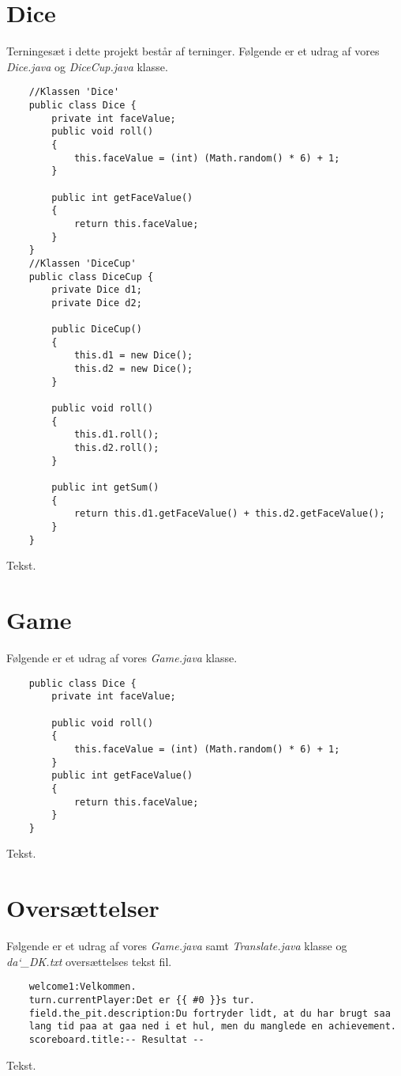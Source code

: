 \section{Dice}
\noindent Terningesæt i dette projekt består af terninger. Følgende er et udrag af vores \textit{Dice.java} og \textit{DiceCup.java} klasse.\\
\begin{lstlisting}
    //Klassen 'Dice'    
    public class Dice {
        private int faceValue;
        public void roll()
        {
            this.faceValue = (int) (Math.random() * 6) + 1;
        }
    
        public int getFaceValue()
        {
            return this.faceValue;
        }
    }
    //Klassen 'DiceCup'
    public class DiceCup {
        private Dice d1;
        private Dice d2;

        public DiceCup()
        {
            this.d1 = new Dice();
            this.d2 = new Dice();
        }
    
        public void roll()
        {
            this.d1.roll();
            this.d2.roll();
        }
    
        public int getSum()
        {
            return this.d1.getFaceValue() + this.d2.getFaceValue();
        }
    }
\end{lstlisting}
\vspace{2ex}

\noindent Tekst.\\

\section{Game}
\noindent Følgende er et udrag af vores \textit{Game.java} klasse.\\
\begin{lstlisting}
    public class Dice {
        private int faceValue;

        public void roll()
        {
            this.faceValue = (int) (Math.random() * 6) + 1;
        }
        public int getFaceValue()
        {
            return this.faceValue;
        }
    }
\end{lstlisting}
\vspace{2ex}

\noindent Tekst.\\

\section{Oversættelser}
\noindent Følgende er et udrag af vores \textit{Game.java} samt \textit{Translate.java} klasse og \textit{da\char`_DK.txt} oversættelses tekst fil.\\
\begin{lstlisting}
    welcome1:Velkommen.
    turn.currentPlayer:Det er {{ #0 }}s tur.
    field.the_pit.description:Du fortryder lidt, at du har brugt saa
    lang tid paa at gaa ned i et hul, men du manglede en achievement.    
    scoreboard.title:-- Resultat --    
\end{lstlisting}
\vspace{2ex}

\noindent Tekst.\\
